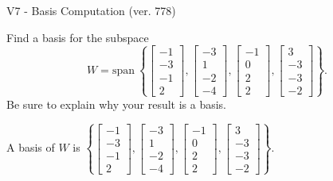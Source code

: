 \begin{exercise}
  \begin{exerciseTitle}V7 - Basis Computation (ver. 778)\end{exerciseTitle}
  \begin{exerciseStatement}
    Find a basis for the subspace 
\[W=\mathrm{span}\ \left\{\left[\begin{array}{r}
-1 \\
-3 \\
-1 \\
2
\end{array}\right] , \left[\begin{array}{r}
-3 \\
1 \\
-2 \\
-4
\end{array}\right] , \left[\begin{array}{r}
-1 \\
0 \\
2 \\
2
\end{array}\right] , \left[\begin{array}{r}
3 \\
-3 \\
-3 \\
-2
\end{array}\right]\right\}.\]
 Be sure to explain why your result is a basis.


  \end{exerciseStatement}
  \begin{exerciseAnswer}
   A basis of \(W\) is  \(\left\{\left[\begin{array}{r}
-1 \\
-3 \\
-1 \\
2
\end{array}\right] , \left[\begin{array}{r}
-3 \\
1 \\
-2 \\
-4
\end{array}\right] , \left[\begin{array}{r}
-1 \\
0 \\
2 \\
2
\end{array}\right] , \left[\begin{array}{r}
3 \\
-3 \\
-3 \\
-2
\end{array}\right]\right\}\).
  


  \end{exerciseAnswer}
\end{exercise}